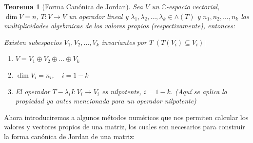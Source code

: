 \documentclass[12pt,a4paper]{article}
\newtheorem{mytheo}{Teorema}[section]
\begin{document}
\begin{multicols}{2}

\begin{mytheo}[Forma Canónica de Jordan]
	Sea $V$ un $\mathbb{C}$-espacio vectorial, $\dim V = n$, $T:V\rightarrow V$ un operador lineal y $\lambda_{1},\lambda_{2},\ldots,\lambda_{k}\in \wedge (T)$ y $n_{1}, n_{2},\ldots , n_{k}$ las multiplicidades algebraicas de los valores propios (respectivamente), entonces:

Existen subespacios $V_{1}, V_{2},\ldots, V_{k}$ invariantes por $T\;\left(T(V_{i})\subseteq V_{i}\right) |$
\begin{enumerate}
	\item	$V = V_{1}\oplus V_{2}\oplus\ldots\oplus V_{k}$
	\item $\dim V_{i} = n_{i},\quad i=1-k$
	\item El operador $T-\lambda_{i}I:V_{i}\rightarrow V_{i}$ es nilpotente, $i=1-k$. (Aquí se aplica la propiedad ya antes mencionada para un operador nilpotente)
	
	
\end{enumerate}
\end{mytheo}
\noindent Ahora introduciremos a algunos métodos numéricos que nos permiten calcular los valores y vectores  propios de una matriz, los cuales son necesarios para construir la forma canónica de Jordan de una matriz:\\

\end{multicols}
\end{document}
